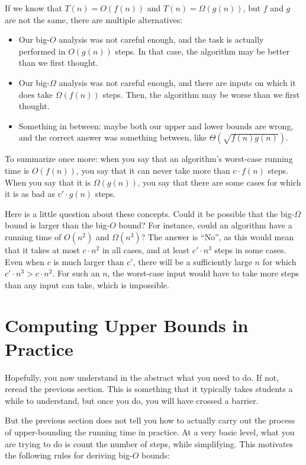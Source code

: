 If we know that $T(n) = O(f(n))$ and $T(n) = \Omega(g(n))$, but $f$
and $g$ are not the same, there are multiple alternatives:
\begin{itemize}
\item Our big-$O$ analysis was not careful enough, and the task is
  actually performed in $O(g(n))$ steps. In that case, the algorithm
  may be better than we first thought.
\item Our big-$\Omega$ analysis was not careful enough, and there are
  inputs on which it does take $\Omega(f(n))$ steps. Then, the
  algorithm may be worse than we first thought.
\item Something in between: maybe both our upper and lower bounds are
  wrong, and the correct answer was something between, like
  $\Theta(\sqrt{f(n) g(n)})$. 
\end{itemize}

To summarize once more: when you say that an algorithm's worst-case
running time is $O(f(n))$, you say that it can never take more than
$c \cdot f(n)$ steps. When you say that it is $\Omega(g(n))$, you say
that there are some cases for which it is as bad as $c' \cdot g(n)$ steps.

Here is a little question about these concepts.
Could it be possible that the big-$\Omega$ bound is larger than the
big-$O$ bound? For instance, could an  algorithm have a running time
of $O(n^2)$ and $\Omega(n^3)$? 
The answer is ``No'', as this would mean that it takes at most
$c \cdot n^2$ in all cases, 
and at least $c' \cdot n^3$ steps in some cases.
Even when $c$ is much larger than $c'$, there will be a sufficiently
large $n$ for which $c' \cdot n^3 > c \cdot n^2$.
For such an $n$, the worst-case input would have to take
more steps than any input can take, which is impossible.

\section{Computing Upper Bounds in Practice}
Hopefully, you now understand in the abstract what you need to do.
If not, reread the previous section.
This is something that it typically takes students a while to
understand, but once you do, you will have crossed a barrier.

But the previous section does not tell you how to actually carry out
the process of upper-bounding the running time in practice.
At a very basic level, what you are trying to do is count the number
of steps, while simplifying.
This motivates the following rules for deriving big-$O$ bounds:

